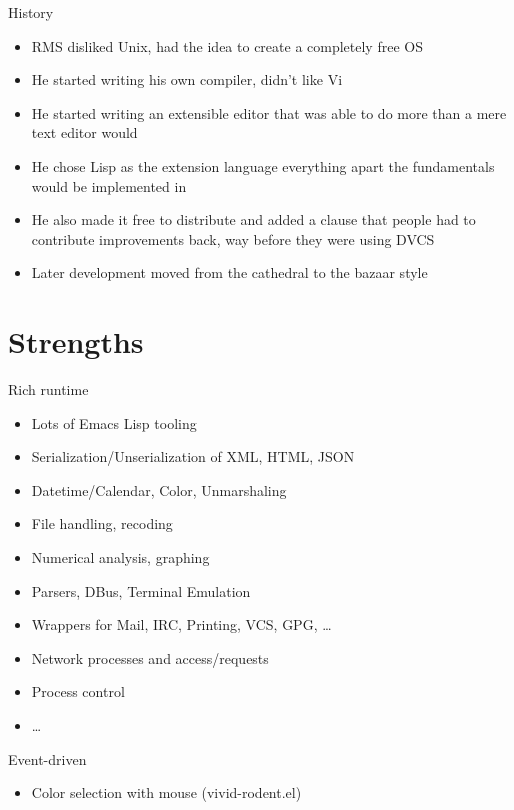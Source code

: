\documentclass[presentation]{beamer}
\begin{document}
\begin{frame}[label=sec-4-1]{History}
\begin{itemize}
\item RMS disliked Unix, had the idea to create a completely free OS
\item He started writing his own compiler, didn't like Vi
\item He started writing an extensible editor that was able to do more than a
mere text editor would
\item He chose Lisp as the extension language everything apart the
fundamentals would be implemented in
\item He also made it free to distribute and added a clause that people
had to contribute improvements back, way before they were using DVCS
\item Later development moved from the cathedral to the bazaar style
\end{itemize}
\end{frame}

\section{Strengths}
\label{sec-5}

\begin{frame}[label=sec-5-1]{Rich runtime}
\begin{itemize}
\item Lots of Emacs Lisp tooling
\item Serialization/Unserialization of XML, HTML, JSON
\item Datetime/Calendar, Color, Unmarshaling
\item File handling, recoding
\item Numerical analysis, graphing
\item Parsers, DBus, Terminal Emulation
\item Wrappers for Mail, IRC, Printing, VCS, GPG, \ldots{}
\item Network processes and access/requests
\item Process control
\item \ldots{}
\end{itemize}
\end{frame}

\begin{frame}[label=sec-5-2]{Event-driven}
\begin{itemize}
\item Color selection with mouse (vivid-rodent.el)
\end{itemize}
\end{frame}
\end{document}
